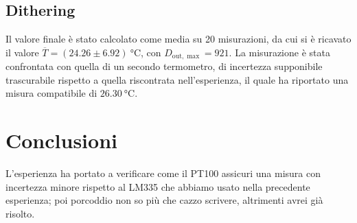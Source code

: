 \documentclass{article}
\begin{document}
\subsection{Dithering}
\begin{table}[H]
    \caption{Misurazioni successive}
\end{table}
Il valore finale è stato calcolato come media su 20 misurazioni, da cui si è ricavato il valore $\overline{T}=(24.26\pm6.92)\SI{}{\celsius}$, con $D_{\text{out}, \max}=921$.
La misurazione è stata confrontata con quella di un secondo termometro, di incertezza supponibile trascurabile rispetto a quella riscontrata nell'esperienza, il quale ha riportato
una misura compatibile di $\SI{26.30}{\celsius}$. 
\section{Conclusioni}
L'esperienza ha portato a verificare come il PT100 assicuri una misura con incertezza minore rispetto al LM335 che abbiamo usato nella precedente esperienza;
poi porcoddio non so più che cazzo scrivere, altrimenti avrei già risolto.
\end{document}
